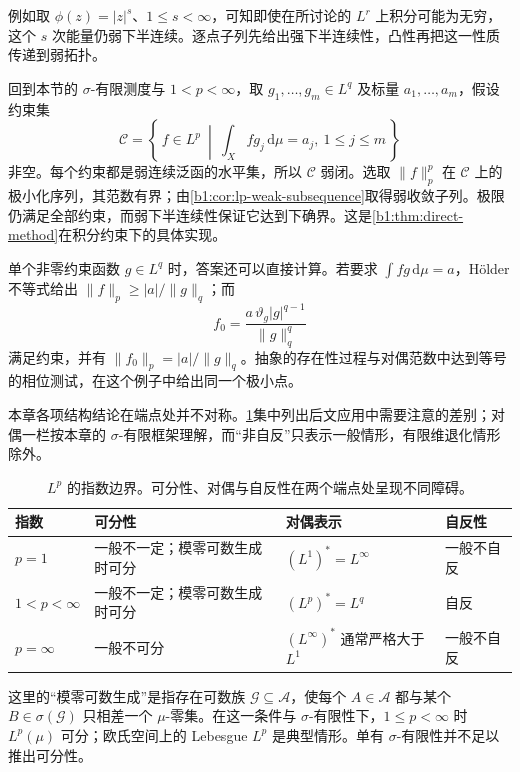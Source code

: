 例如取 \(\phi(z)=|z|^s\)、\(1\le s<\infty\)，可知即使在所讨论的 \(L^r\) 上积分可能为无穷，这个 \(s\) 次能量仍弱下半连续。逐点子列先给出强下半连续性，凸性再把这一性质传递到弱拓扑。

\ProseParagraphBreak

回到本节的 \(\sigma\)-有限测度与 \(1<p<\infty\)，取 \(g_1,\ldots,g_m\in L^q\) 及标量 \(a_1,\ldots,a_m\)，假设约束集
\[
 \mathcal C=\left\{\,f\in L^p\ \middle|\
   \int_Xfg_j\,\mathrm d\mu=a_j,\ 1\le j\le m\,\right\}
\]
非空。每个约束都是弱连续泛函的水平集，所以 \(\mathcal C\) 弱闭。选取 \(\|f\|_p^p\) 在 \(\mathcal C\) 上的极小化序列，其范数有界；由\cref{b1:cor:lp-weak-subsequence}取得弱收敛子列。极限仍满足全部约束，而弱下半连续性保证它达到下确界。这是\cref{b1:thm:direct-method}在积分约束下的具体实现。

\ProseParagraphBreak

单个非零约束函数 \(g\in L^q\) 时，答案还可以直接计算。若要求 \(\int fg\,\mathrm d\mu=a\)，Hölder 不等式给出 \(\|f\|_p\ge |a|/\|g\|_q\)；而
\[
 f_0=\dfrac{a\,\vartheta_g|g|^{q-1}}{\|g\|_q^q}
\]
满足约束，并有 \(\|f_0\|_p=|a|/\|g\|_q\)。抽象的存在性过程与对偶范数中达到等号的相位测试，在这个例子中给出同一个极小点。

\ProseParagraphBreak

本章各项结构结论在端点处并不对称。\cref{b1:tab:lp-exponent-structure}集中列出后文应用中需要注意的差别；对偶一栏按本章的 \(\sigma\)-有限框架理解，而“非自反”只表示一般情形，有限维退化情形除外。
\begin{table}[htbp]
  \centering
  \caption[\(L^p\) 的指数边界]{\(L^p\) 的指数边界。可分性、对偶与自反性在两个端点处呈现不同障碍。}
  \label{b1:tab:lp-exponent-structure}
  \begin{tabularx}{\textwidth}{@{}p{2.3cm}p{3.6cm}p{4.3cm}X@{}}
    \toprule
    指数 & 可分性 & 对偶表示 & 自反性 \\
    \midrule
    \(p=1\) & 一般不一定；模零可数生成时可分 & \((L^1)^*=L^\infty\) & 一般不自反 \\
    \(1<p<\infty\) & 一般不一定；模零可数生成时可分 & \((L^p)^*=L^q\) & 自反 \\
    \(p=\infty\) & 一般不可分 & \((L^\infty)^*\) 通常严格大于 \(L^1\) & 一般不自反 \\
    \bottomrule
  \end{tabularx}
\end{table}

这里的“模零可数生成”是指存在可数族 \(\mathcal G\subseteq\mathcal A\)，使每个 \(A\in\mathcal A\) 都与某个 \(B\in\sigma(\mathcal G)\) 只相差一个 \(\mu\)-零集。在这一条件与 \(\sigma\)-有限性下，\(1\leq p<\infty\) 时 \(L^p(\mu)\) 可分；欧氏空间上的 Lebesgue \(L^p\) 是典型情形。单有 \(\sigma\)-有限性并不足以推出可分性。
